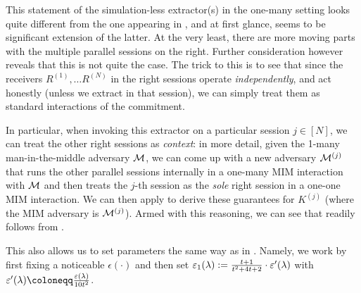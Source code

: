 
This statement of the simulation-less extractor(s) in the one-many setting looks quite different from the one appearing in , and at first glance, seems to be significant extension of the latter. At the very least, there are more moving parts with the multiple parallel sessions on the right. Further consideration however reveals that this is not quite the case. The trick to this is to see that since the receivers $R^{(1)},\dots R^{(N)}$ in the right sessions operate {\em independently}, and act honestly (unless we extract in that session), we can simply treat them as standard interactions of the commitment. 

In particular, when invoking this extractor on a particular session $j \in [N]$, we can treat the other right sessions as {\em context}: in more detail, given the 1-many man-in-the-middle adversary $\mathcal{M}$, we can come up with a new adversary $\mathcal{M}^{(j)}$ that runs the other parallel sessions internally in a one-many MIM interaction with $\mathcal{M}$ and then treats the $j$-th session as the {\em sole} right session in a one-one MIM interaction. We can then apply  to derive these guarantees for $K^{(j)}$ (where the MIM adversary is $\mathcal{M}^{(j)}$). Armed with this reasoning, we can see that  readily follows from . 

This also allows us to set parameters the same way as in . Namely, we work by first fixing a noticeable $\epsilon(\cdot)$ and then set $\varepsilon_1(\lambda):= \frac{t+1}{t^2+4t+2}\cdot \varepsilon'(\lambda)$ with $ \epsilon'(\secpar) \coloneqq \frac{\epsilon(\secpar)}{10t^2}$. 



